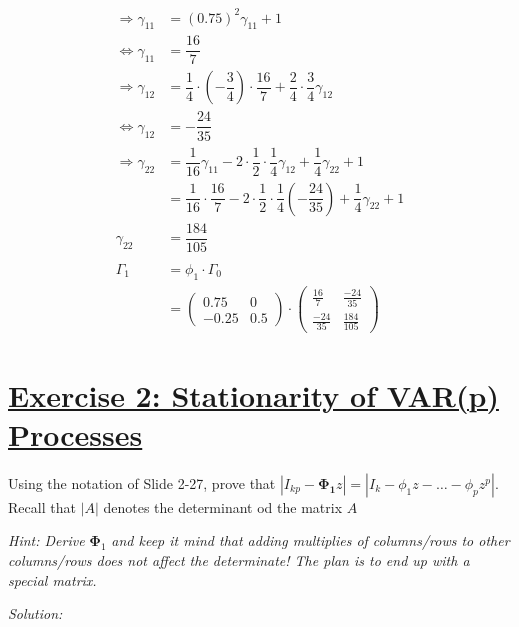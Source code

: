\documentclass[12pt,a4paper]{article}
\newcommand{\tmpsection}[1]{}
\let\tmpsection=\section
\renewcommand{\section}[1]{\tmpsection{\underline{#1}} }
\begin{document}
\begin{align*}
  \Rightarrow \gamma_{11} & = (0.75)^2 \gamma_{11} + 1\\
  \Leftrightarrow \gamma_{11} & = \dfrac{16}{7}\\
  \Rightarrow \gamma_{12} & = \dfrac{1}{4} \cdot \left( - \dfrac{3}{4} \right) \cdot \dfrac{16}{7} + \dfrac{2}{4} \cdot \dfrac{3}{4} \gamma_{12} \\
  \Leftrightarrow \gamma_{12} & = - \dfrac{24}{35}\\
  \Rightarrow \gamma_{22} & = \dfrac{1}{16} \gamma_{11} - 2 \cdot \dfrac{1}{2} \cdot \dfrac{1}{4} \gamma_{12} + \dfrac{1}{4} \gamma_{22} + 1 \\
  & =  \dfrac{1}{16} \cdot \dfrac{16}{7} - 2 \cdot \dfrac{1}{2} \cdot \dfrac{1}{4} \left(- \dfrac{24}{35} \right) + \dfrac{1}{4} \gamma_{22} + 1\\
  \gamma_{22} & = \dfrac{184}{105}\\
  \\
  \Gamma_1 & = \phi_1 \cdot \Gamma_0\\
  & = 
  \begin{pmatrix} 
  0.75 & 0 \\
  -0.25 & 0.5
  \end{pmatrix}
  \cdot 
  \begin{pmatrix} 
  \frac{16}{7} & \frac{-24}{35}\\
  \frac{-24}{35} & \frac{184}{105}
  \end{pmatrix}
\end{align*}

\hypertarget{exercise-2-stationarity-of-varp-processes}{%
\section{Exercise 2: Stationarity of VAR(p)
Processes}\label{exercise-2-stationarity-of-varp-processes}}

Using the notation of Slide 2-27, prove that
\(|I_{kp} - \pmb{\Phi_1} z| = |I_k - \phi_1 z - \ldots - \phi_p z^p|\).
Recall that \(|A|\) denotes the determinant od the matrix \(A\)

\emph{Hint: Derive} \(\pmb{\Phi}_1\) \emph{and keep it mind that adding
multiplies of columns/rows to other columns/rows does not affect the
determinate! The plan is to end up with a special matrix.}

\emph{Solution:}
\end{document}

